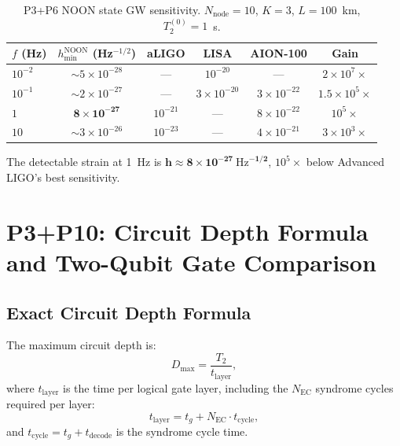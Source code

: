 \documentclass[11pt]{article}
\theoremstyle{definition}
\theoremstyle{remark}
\begin{document}
\begin{table}[h]
\centering
\caption{P3+P6 NOON state GW sensitivity. $N_{\mathrm{node}}=10$,
  $K=3$, $L=100$~km, $T_2^{(0)}=1$~s.}
\label{tab:gw-sensitivity}
\begin{tabular}{@{}lccccc@{}}
\toprule
$f$ (Hz) & $h_{\min}^{\mathrm{NOON}}$ (Hz$^{-1/2}$) & aLIGO & LISA & AION-100 & Gain \\
\midrule
$10^{-2}$ & $\sim5\times10^{-28}$ & --- & $10^{-20}$ & --- & $2\times10^{7}\times$ \\
$10^{-1}$ & $\sim2\times10^{-27}$ & --- & $3\times10^{-20}$ & $3\times10^{-22}$ & $1.5\times10^{5}\times$ \\
$1$ & $\mathbf{8\times10^{-27}}$ & $10^{-21}$ & --- & $8\times10^{-22}$ & $10^{5}\times$ \\
$10$ & $\sim3\times10^{-26}$ & $10^{-23}$ & --- & $4\times10^{-21}$ & $3\times10^{3}\times$ \\
\bottomrule
\end{tabular}
\end{table}

The detectable strain at 1~Hz is $\mathbf{h\approx8\times10^{-27}~\mathrm{Hz}^{-1/2}}$,
$10^5\times$ below Advanced LIGO's best sensitivity.

\section{P3+P10: Circuit Depth Formula and Two-Qubit Gate Comparison}
\label{sec:p3p10}

\subsection{Exact Circuit Depth Formula}

The maximum circuit depth is:
\begin{equation}
  D_{\max} = \frac{T_2}{t_{\mathrm{layer}}}, \label{eq:dmax-basic}
\end{equation}
where $t_{\mathrm{layer}}$ is the time per logical gate layer, including
the $N_{\mathrm{EC}}$ syndrome cycles required per layer:
\begin{equation}
  t_{\mathrm{layer}} = t_g + N_{\mathrm{EC}}\cdot t_{\mathrm{cycle}},
  \label{eq:tlayer}
\end{equation}
and $t_{\mathrm{cycle}} = t_g + t_{\mathrm{decode}}$ is the syndrome
cycle time.
\end{document}
